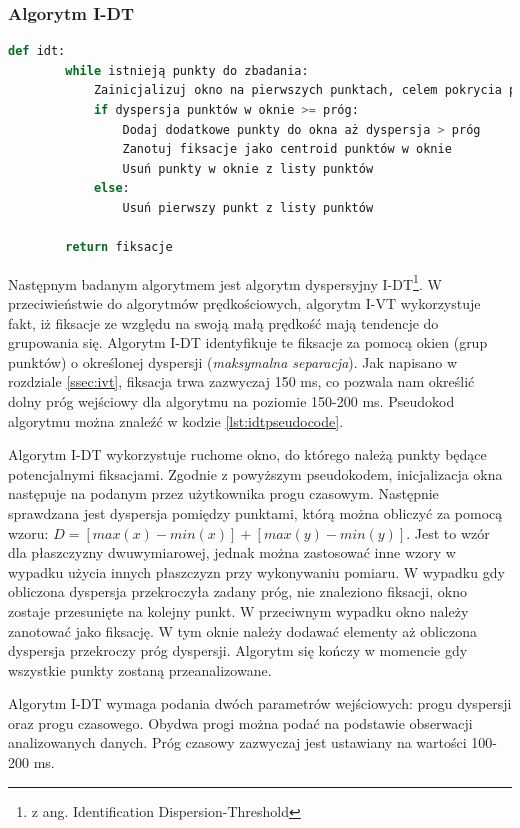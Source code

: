 \subsubsection{Algorytm I-DT}
\label{ssec:idt}
\begin{lstlisting}[language=Python, caption=Pseudokod algorytmu I-DT, label={lst:idtpseudocode}]
    def idt:
        while istnieją punkty do zbadania:
            Zainicjalizuj okno na pierwszych punktach, celem pokrycia progu czasowego.
            if dyspersja punktów w oknie >= próg:
                Dodaj dodatkowe punkty do okna aż dyspersja > próg
                Zanotuj fiksacje jako centroid punktów w oknie
                Usuń punkty w oknie z listy punktów
            else:
                Usuń pierwszy punkt z listy punktów
        
        return fiksacje
\end{lstlisting}
Następnym badanym algorytmem jest algorytm dyspersyjny I-DT\footnote{z ang. Identification Dispersion-Threshold}. W przeciwieństwie do algorytmów prędkościowych, algorytm I-VT wykorzystuje fakt, iż fiksacje ze względu na swoją małą prędkość mają tendencje do grupowania się. Algorytm I-DT identyfikuje te fiksacje za pomocą okien (grup punktów) o określonej dyspersji (\emph{maksymalna separacja}). Jak napisano w rozdziale \ref{ssec:ivt}, fiksacja trwa zazwyczaj 150 ms, co pozwala nam określić dolny próg wejściowy dla algorytmu na poziomie 150-200 ms. Pseudokod algorytmu można znaleźć w kodzie \ref{lst:idtpseudocode}.\par
Algorytm I-DT wykorzystuje ruchome okno, do którego należą punkty będące potencjalnymi fiksacjami. Zgodnie z powyższym pseudokodem, inicjalizacja okna następuje na podanym przez użytkownika progu czasowym. Następnie sprawdzana jest dyspersja pomiędzy punktami, którą można obliczyć za pomocą wzoru: $D = [max(x) - min(x)] + [max(y) - min(y)]$. Jest to wzór dla płaszczyzny dwuwymiarowej, jednak można zastosować inne wzory w wypadku użycia innych płaszczyzn przy wykonywaniu pomiaru. W wypadku gdy obliczona dyspersja przekroczyła zadany próg, nie znaleziono fiksacji, okno zostaje przesunięte na kolejny punkt. W przeciwnym wypadku okno należy zanotować jako fiksację. W tym oknie należy dodawać elementy aż obliczona dyspersja przekroczy próg dyspersji. Algorytm się kończy w momencie gdy wszystkie punkty zostaną przeanalizowane.\par
Algorytm I-DT wymaga podania dwóch parametrów wejściowych: progu dyspersji oraz progu czasowego. Obydwa progi można podać na podstawie obserwacji analizowanych danych. Próg czasowy zazwyczaj jest ustawiany na wartości 100-200 ms.
